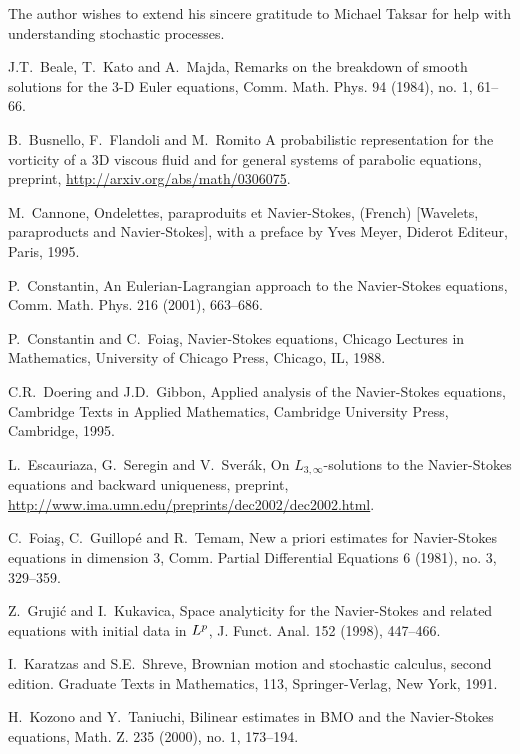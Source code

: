 \documentclass[12pt]{amsart}
\theoremstyle{remark}
\begin{document}
The author wishes to extend his sincere gratitude to Michael Taksar for
help with understanding stochastic processes.


\begin{thebibliography}{999}

J.T.~Beale, T.~Kato and A.~Majda, 
Remarks on the breakdown of smooth solutions for the $3$-D Euler equations,  
Comm. Math. Phys.  94  (1984),  no. 1, 61--66.

B.~Busnello, F.~Flandoli and M.~Romito
A probabilistic representation for the vorticity of a 3D viscous 
fluid and for general systems of parabolic equations, preprint,
\url{http://arxiv.org/abs/math/0306075}.

M.~Cannone,  Ondelettes, paraproduits et Navier-Stokes, (French) 
[Wavelets, paraproducts and Navier-Stokes], 
with a preface by Yves Meyer, 
Diderot Editeur, Paris, 1995.

P.~Constantin,
An Eulerian-Lagrangian approach to the Navier-Stokes equations, 
Comm. Math. Phys.  216  (2001), 663--686.

P.~Constantin and C.~Foia\c s, 
Navier-Stokes equations, 
Chicago Lectures in Mathematics,
University of Chicago Press, Chicago, IL, 1988.

C.R.~Doering and J.D.~Gibbon,
Applied analysis of the Navier-Stokes equations,
Cambridge Texts in Applied Mathematics,
Cambridge University Press, Cambridge, 1995.

L.~Escauriaza, G.~Seregin and V.~Sver\'ak,
On 
$L_{3,\infty}$-solutions to the Navier-Stokes equations and backward 
uniqueness,
preprint, \url{http://www.ima.umn.edu/preprints/dec2002/dec2002.html}.

C.~Foia\c s, C.~Guillop\'e and R.~Temam,
New a priori estimates for Navier-Stokes equations in dimension $3$,
Comm. Partial Differential Equations 6 (1981), no. 3, 329--359.

Z.~Gruji\'c and I.~Kukavica,
Space analyticity for the Navier-Stokes and related 
equations with initial data in $L\sp p$,
J. Funct. Anal.  152  (1998), 447--466.

I.~Karatzas and S.E.~Shreve,
Brownian motion and stochastic calculus,
second edition. Graduate Texts in Mathematics, 113,
Springer-Verlag, New York, 1991.

H.~Kozono and Y.~Taniuchi, 
Bilinear estimates in BMO and the Navier-Stokes equations,  
Math. Z.  235  (2000),  no. 1, 173--194.


\end{thebibliography}
\end{document}
